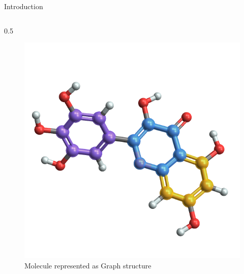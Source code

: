 \begin{frame}{Introduction}
\begin{columns}
\begin{column}{{0.5\textwidth}}
\begin{center}
\begin{figure}[H]
                    \centering
                    \captionsetup{justification=centering}
                    \includegraphics[scale=.15]{figures/introduction/molecular_graph.png}
                    \vspace{-0.25cm}
                    \caption*{\scriptsize Molecule represented as Graph structure\footnotemark}
                \end{figure}
            \end{center}
        \end{column}
    \end{columns}
\end{frame}
